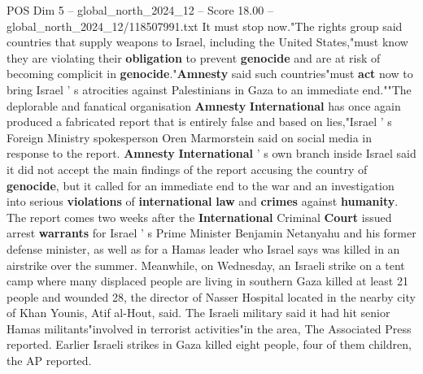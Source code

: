 \begin{textsample}{POS Dim 5 – global\_north\_2024\_12 – Score 18.00 – global\_north\_2024\_12/118507991.txt}
It must stop now."The rights group said countries that supply weapons to Israel, including the United States,"must know they are violating their \textbf{obligation} to prevent \textbf{genocide} and are at risk of becoming complicit in \textbf{genocide}."\textbf{Amnesty} said such countries"must \textbf{act} now to bring Israel ' s atrocities against Palestinians in Gaza to an immediate end.""The deplorable and fanatical organisation \textbf{Amnesty} \textbf{International} has once again produced a fabricated report that is entirely false and based on lies,"Israel ' s Foreign Ministry spokesperson Oren Marmorstein said on social media in response to the report. \textbf{Amnesty} \textbf{International} ' s own branch inside Israel said it did not accept the main findings of the report accusing the country of \textbf{genocide}, but it called for an immediate end to the war and an investigation into serious \textbf{violations} of \textbf{international} \textbf{law} and \textbf{crimes} against \textbf{humanity}.
The report comes two weeks after the \textbf{International} Criminal \textbf{Court} issued arrest \textbf{warrants} for Israel ' s Prime Minister Benjamin Netanyahu and his former defense minister, as well as for a Hamas leader who Israel says was killed in an airstrike over the summer.
Meanwhile, on Wednesday, an Israeli strike on a tent camp where many displaced people are living in southern Gaza killed at least 21 people and wounded 28, the director of Nasser Hospital located in the nearby city of Khan Younis, Atif al-Hout, said.
The Israeli military said it had hit senior Hamas militants"involved in terrorist activities"in the area, The Associated Press reported.
Earlier Israeli strikes in Gaza killed eight people, four of them children, the AP reported.

\end{textsample}
